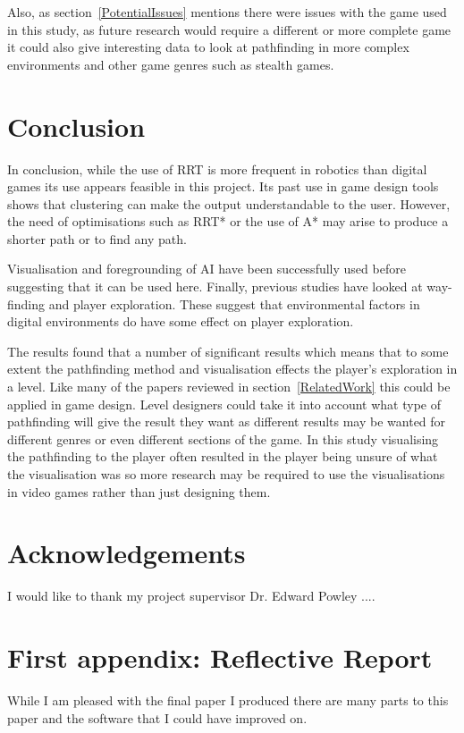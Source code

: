 \documentclass[journal]{IEEEtran}
\begin{document}
	Also, as section~\ref{PotentialIssues} mentions there were issues with the game used in this study, as future research would require a different or more complete game it could also give interesting data to look at pathfinding in more complex environments and other game genres such as stealth games. 
	
	
	\section{Conclusion} 
	In conclusion, while the use of RRT is more frequent in robotics than digital games its use appears feasible in this project. Its past use in game design tools shows that clustering can make the output understandable to the user. However, the need of optimisations such as RRT* or the use of A* may arise to produce a shorter path or to find any path. 
	
	Visualisation and foregrounding of AI have been successfully used before suggesting that it can be used here. Finally, previous studies have looked at way-finding and player exploration. These suggest that environmental factors in digital environments do have some effect on player exploration.
	
	The results found that a number of significant results which means that to some extent the pathfinding method and visualisation effects the player's exploration in a level.  Like many of the papers reviewed in section~\ref{RelatedWork} this could be applied in game design. Level designers could take it into account what type of pathfinding will give the result they want as different results may be wanted for different genres or even different sections of the game. In this study visualising the pathfinding to the player often resulted in the player being unsure of what the visualisation was so more research may be required to use the visualisations in video games rather than just designing them.
	
	
	
	
	\appendices
	\section{Acknowledgements}
	I would like to thank my project supervisor Dr. Edward Powley ....
	
	\section{First appendix: Reflective Report}
	While I am pleased with the final paper I produced there are many parts to this paper and the software that I could have improved on. 
	
\end{document}
